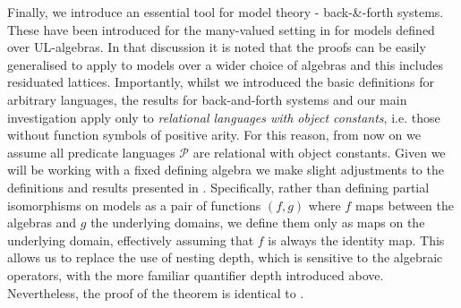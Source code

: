 \documentclass{lmcs} %
\newcommand{\?}{\ensuremath{\mkern0.4\thinmuskip}}
\newcommand{\CP}{\mathcal{P}}
\begin{document}
Finally, we introduce an essential tool for model theory - back-\&-forth systems. These have been introduced for the many-valued setting in \cite{DellundeGarciaNoguera18:Fuzzybackandforth} for models defined over UL-algebras. In that discussion it is noted that the proofs can be easily generalised to apply to models over a wider choice of algebras and this includes residuated lattices. Importantly, whilst we introduced the basic definitions for arbitrary languages, the results for back-and-forth systems and our main investigation apply only to \textit{relational languages with object constants}, i.e. those without function symbols of positive arity. For this reason, from now on we assume all predicate  languages $\CP$ are relational with object constants. Given we will be working with a fixed defining algebra we make slight adjustments to the definitions and results presented in \cite{DellundeGarciaNoguera18:Fuzzybackandforth}. Specifically, rather than defining partial isomorphisms on models as a pair of functions $(f,g)$ where $f$ maps between the algebras and $g$ the underlying domains, we define them only as maps on the underlying domain, effectively assuming that $f$ is always the identity map. This allows us to replace the use of nesting depth, which is sensitive to the algebraic operators, with the more familiar quantifier depth introduced above. Nevertheless, the proof of the theorem is identical to \cite[Theorem 22]{DellundeGarciaNoguera18:Fuzzybackandforth}.
\end{document}
